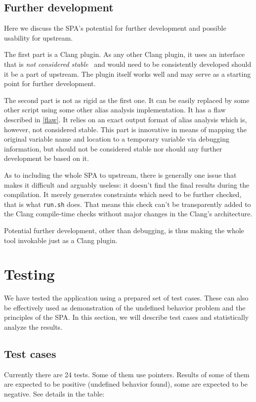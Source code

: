 \subsection{Further development}
Here we discuss the SPA's potential for further development and possible usability for upstream.

The first part is a Clang plugin. As any other Clang plugin, it uses an interface that is \emph{not considered stable}~\cite{clang-unstable} and would need to be consistently developed should it be a part of upstream. The plugin itself works well and may serve as a starting point for further development.

The second part is not as rigid as the first one. It can be easily replaced by some other script using some other alias analysis implementation. It has a flaw described in \ref{flaw}. It relies on an exact output format of alias analysis which is, however, not considered stable. This part is innovative in means of mapping the original variable name and location to a temporary variable via debugging information, but should not be considered stable nor should any further development be based on it.

As to including the whole SPA to upstream, there is generally one issue that makes it difficult and arguably useless: it doesn't find the final results during the compilation. It merely generates constraints which need to be further checked, that is what \verb|run.sh| does. That means this check can't be transparently added to the Clang compile-time checks without major changes in the Clang's architecture.

Potential further development, other than debugging, is thus making the whole tool invokable just as a Clang plugin.
\section{Testing}
We have tested the application using a prepared set of test cases. These can also be effectively used as demonstration of the undefined behavior problem and the principles of the SPA.
In this section, we will describe test cases and statistically analyze the results.
\subsection{Test cases}
Currently there are 24 tests. Some of them use pointers. Results of some of them are expected to be positive (undefined behavior found), some are expected to be negative. See details in the table:

